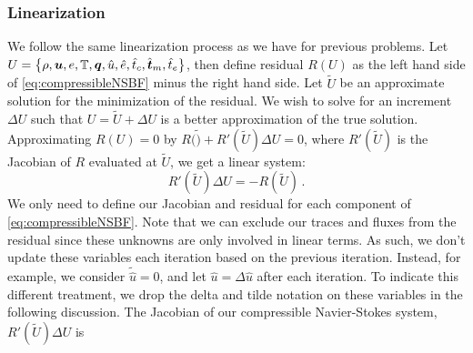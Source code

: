 \documentclass[Proposal.tex]{subfiles}
\begin{document}
\subsubsection{Linearization}
We follow the same linearization process as we have for previous problems.
Let $U=\left\{ \rho,\boldsymbol u,e,\mathbb{T},\boldsymbol q,\hat u,\hat e,\hat t_c,\hat{\boldsymbol t}_m,\hat t_e \right\}$, 
then define residual $R(U)$ as the left hand side of \eqref{eq:compressibleNSBF} minus the right hand side.
Let $\tilde U$ be an approximate solution for the minimization of the residual. 
We wish to solve for an increment $\Delta U$ such that $U=\tilde U+\Delta U$ is a better approximation of the true solution.
Approximating $R(U)=0$ by $R(\tilde)+R'(\tilde U)\Delta U=0$, where $R'(\tilde U)$ is the Jacobian of $R$ evaluated at $\tilde U$, we get a linear system:
\begin{equation}
	R'(\tilde U)\Delta U=-R(\tilde U)\,.
\end{equation}
We only need to define our Jacobian and residual for each component of \eqref{eq:compressibleNSBF}. 
Note that we can exclude our traces and fluxes from the residual since these unknowns are only involved in linear terms.
As such, we don't update these variables each iteration based on the previous iteration.
Instead, for example, we consider $\tilde{\hat u}=0$, and let $\hat u=\Delta\hat u$ after each iteration.
To indicate this different treatment, we drop the delta and tilde notation on these variables in the following discussion.
The Jacobian of our compressible Navier-Stokes system, $R'(\tilde U)\Delta U$ is
\end{document}
